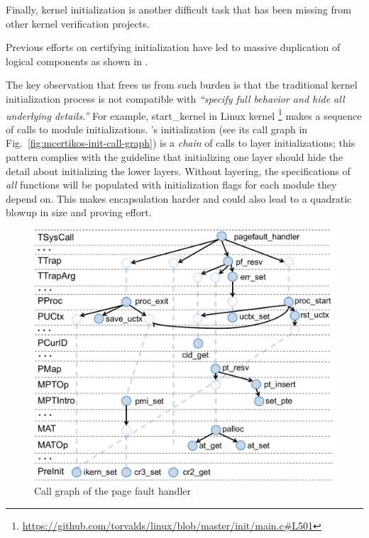 Finally, kernel initialization is another difficult task
that has been missing from other kernel verification projects.

Previous efforts on certifying initialization have led to massive duplication
of logical components as shown in \cite{vaynberg12}.

The key observation that frees us from such burden is that the traditional
kernel initialization process is not compatible with
\emph{``specify full behavior and hide all underlying details.''}
For example, \textsf{start\_kernel} in Linux
kernel \footnote{\url{https://github.com/torvalds/linux/blob/master/init/main.c\#L501}}
makes a sequence of calls to module initializations.  \mCTOSbase's
initialization (see its call graph in
Fig.\ \ref{fig:mcertikos-init-call-graph}) is a \emph{chain} of calls
to layer initializations; this pattern complies with the guideline that 
initializing one layer should
hide the detail about initializing the lower layers.
Without layering, the specifications of \emph{all} functions will be populated
with initialization flags for each module they depend on. This
makes encapsulation harder and could also lead to
a quadratic blowup in size and proving effort.

\begin{figure}
\center
\includegraphics[scale=0.3]{figs/pagefault2}
\caption{Call graph of the page fault handler}
\label{fig:pagefault-call-graph}
\end{figure}

